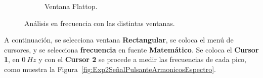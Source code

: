 \begin{figure}[H]
\begin{subfigure}[H]{0.48\textwidth}
          \caption{Ventana Flattop.}
        \end{subfigure}

        \caption{Análisis en frecuencia con las distintas ventanas.}
        \label{fig:Exp2SeñalPulsanteVentanasEspectro}
      \end{figure}

      A continuación, se selecciona ventana \textbf{Rectangular}, se coloca el menú de cursores, y se selecciona 
      \textbf{frecuencia} en fuente 
      \textbf{Matemático}. Se coloca el \textbf{Cursor 1}, en $0~Hz$ y con el \textbf{Cursor 2} se 
      procede a medir las frecuencias de cada pico, como muestra la 
      Figura~\ref{fig:Exp2SeñalPulsanteArmonicosEspectro}.

